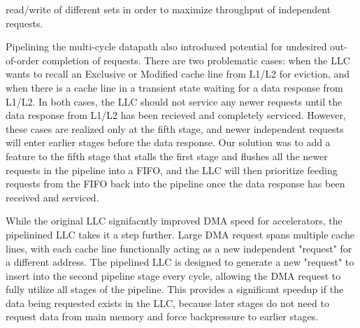 read/write of different sets in order to maximize throughput of independent requests.
\par Pipelining the multi-cycle datapath also introduced potential for undesired out-of-order completion of requests. There are two problematic cases: when the LLC wants to recall an Exclusive or Modified 
cache line from L1/L2 for eviction, and when there is a cache line in a transient state waiting for a data response from L1/L2. In both cases, the LLC should not service any newer requests until the data response from L1/L2 has been 
recieved and completely serviced. However, these cases are realized only at the fifth stage, and newer independent requests will enter earlier stages before the data response. Our solution was to add a feature to the 
fifth stage that stalls the first stage and flushes all the newer requests in the pipeline into a FIFO, and the LLC will then prioritize feeding requests from the FIFO back into the pipeline 
once the data response has been received and serviced.
\par While the original LLC signifacntly improved DMA speed for accelerators, the pipelinined LLC takes it a step further. Large DMA request spans multiple cache lines, 
with each cache line functionally acting as a new independent "request" for a different address. The pipelined LLC is designed to generate a new "request" to insert into the second pipeline stage every cycle,  
allowing the DMA request to fully utilize all stages of the pipeline. This provides a significant speedup if the data 
being requested exists in the LLC, because later stages do not need to request data from main memory and force backpressure to earlier stages.

